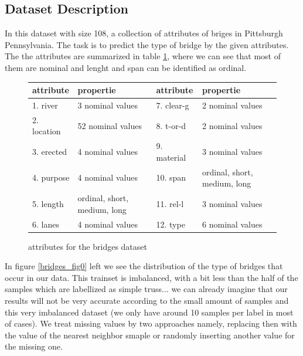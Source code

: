 \documentclass[11pt]{article}
\begin{document}
\subsection{Dataset Description}
In this dataset with size 108, a collection of attributes of briges in Pittsburgh Pennsylvania. The task is to predict the type of bridge by the given attributes. The the attributes are summarized in table \ref{bridgetab_tab0}, where we can see that most of them are nominal and lenght and span can be identified as ordinal. 
%
\begin{figure}
  \begin{tabular}{ | l | l | l | l |}
    \hline
    attribute & propertie 				    & attribute   & propertie 				\\ \hline
    1. river 		 & 3 nominal values 		    & 7. clear-g 		 & 2 nominal values			\\ \hline
    2. location 	 & 52 nominal values 		    & 8. t-or-d  	 & 2 nominal values			\\ \hline
    3. erected 		 & 4 nominal values 		    & 9. material  	 & 3 nominal values			\\ \hline
    4. purpose 		 & 4 nominal values 		    & 10. span  	& ordinal, short, medium, long			\\ \hline
    5. length 		 & ordinal, short, medium, long & 11. rel-l       & 3 nominal values			\\ \hline
    6. lanes		 & 4 nominal values	  			& 12. type		 & 6 nominal values 			\\ \hline
  \end{tabular}
  \caption{attributes for the bridges dataset}
  \label{bridgetab_tab0}
\end{figure}
%
In figure \ref{bridges_fig0} left we see the distribution of the type of bridges that occur in our data. 
This trainset is imbalanced, with a bit less than the half of the samples which are labellized as simple truss... we can already imagine that our results will not be very accurate according to the small amount of samples and this very imbalanced dataset (we only have around 10 samples per label in most of cases). We treat missing values by two approaches namely, replacing then with the value of the nearest neighbor smaple or randomly inserting another value for the missing one.
\end{document}
